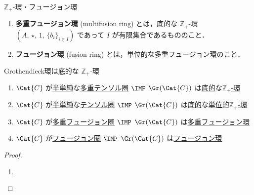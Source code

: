 \documentclass[TQFT_main]{subfiles}
\begin{document}
\begin{mydef}[label=def:Z+ring]{$\mathbb{Z}_+$-環・フュージョン環}
\begin{enumerate}
\begin{description}
\begin{align}
            \end{align}
            が，$\forall i,\, j \in I$ に対して以下を充たす：
            \begin{align}
                \tau (b_i \star b_j) 
                &= \delta_{i,\,j^*}
            \end{align}
        \end{description}
        \item \textbf{多重フュージョン環} (multifusion ring) とは，底的な $\mathbb{Z}_+$-環 $(A,\, \star,\, 1,\, \{b_i\}_{i \in I})$ であって $I$ が有限集合であるもののこと．
        \item \textbf{フュージョン環} (fusion ring) とは，単位的な多重フュージョン環のこと．
    \end{enumerate}
\end{mydef}

\begin{mylem}[label=lem:Gr-based]{Grothendieck環は底的な $\mathbb{Z}_+$-環}
    \begin{enumerate}
        \item $\Cat{C}$ が\hyperref[def:semisimple-cat]{半単純}な\hyperref[def:tensorfusion-cat]{多重テンソル圏} $\IMP$ $\Gr(\Cat{C})$ は\hyperref[def:Z+ring]{底的}な\hyperref[def:Z+ring]{$\mathbb{Z}_+$-環}
        \item $\Cat{C}$ が\hyperref[def:semisimple-cat]{半単純}な\hyperref[def:tensorfusion-cat]{テンソル圏} $\IMP$ $\Gr(\Cat{C})$ は\hyperref[def:Z+ring]{底的}な\hyperref[def:Z+ring]{単位的}\hyperref[def:Z+ring]{$\mathbb{Z}_+$-環}
        \item $\Cat{C}$ が\hyperref[def:tensorfusion-cat]{多重フュージョン圏} $\IMP$ $\Gr(\Cat{C})$ は\hyperref[def:Z+ring]{多重フュージョン環}
        \item $\Cat{C}$ が\hyperref[def:tensorfusion-cat]{フュージョン圏} $\IMP$ $\Gr(\Cat{C})$ は\hyperref[def:Z+ring]{フュージョン環}
    \end{enumerate}
\end{mylem}

\begin{proof}
    \begin{enumerate}
        \item 
    \end{enumerate}
\end{proof}
\end{document}
